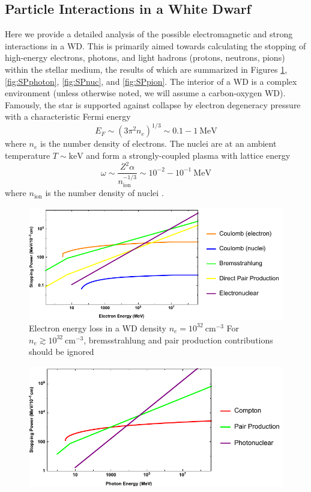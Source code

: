 \documentclass[twocolumn,showpacs,preprintnumbers,amsmath,amssymb,prd]{revtex4}
\begin{document}
\begin{appendices}

\section{Particle Interactions in a White Dwarf}
\label{sec:appendix}
Here we provide a detailed analysis of the possible electromagnetic and strong interactions in a WD.
This is primarily aimed towards calculating the stopping of high-energy electrons, photons, and light hadrons (protons, neutrons, pions) within the stellar medium, the results of which are summarized in Figures \ref{fig:SPelectron}, \ref{fig:SPphoton}, \ref{fig:SPnuc}, and \ref{fig:SPpion}.
The interior of a WD is a complex environment (unless otherwise noted, we will assume a carbon-oxygen WD).
Famously, the star is supported against collapse by electron degeneracy pressure with a characteristic Fermi energy
\begin{equation}
E_F \sim (3 \pi^2 n_e)^{1/3} \sim 0.1 - 1 ~\text{MeV}
\end{equation}
where $n_e$ is the number density of electrons.
The nuclei are at an ambient temperature $T \sim \text{keV}$ and form a strongly-coupled plasma with lattice energy
\begin{equation}
\label{eq:lattice}
\omega \sim \frac{Z^2 \alpha}{n_\text{ion}^{-1/3}} \sim 10^{-2} - 10^{-1} ~\text{MeV}
\end{equation}
where $n_\text{ion}$ is the number density of nuclei \cite{Teukolsky}. 
\begin{figure}
\includegraphics[scale=.45]{SPelectron.pdf}
\caption{Electron energy loss in a WD density $n_e = 10^{32} ~\text{cm}^{-3}$ For $n_e \gtrsim 10^{32} ~\text{cm}^{-3}$, bremsstrahlung and pair production contributions should be ignored}
\label{fig:SPelectron}
\end{figure}
\begin{figure}
\includegraphics[scale=.45]{SPphoton.pdf}

\end{figure}
\end{appendices}
\end{document}
